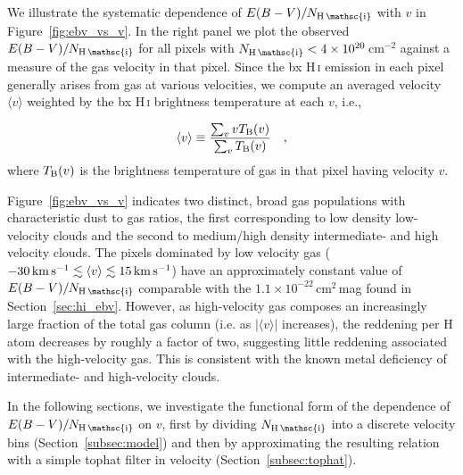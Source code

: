 \documentclass[iop,apj]{emulateapj}
\makeatletter
\def\testbx{bx}%
\DeclareRobustCommand{\ion}[2]{%
\relax\ifmmode
\ifx\testbx\f@series
{\mathbf{#1\,\mathsc{#2}}}\else
{\mathrm{#1\,\mathsc{#2}}}\fi
\else\textup{#1\,{\mdseries\textsc{#2}}}%
\fi}
\makeatother
\begin{document}
We illustrate the systematic dependence of $E(B-V)/N_\ion{H}{i}$ with $v$ in Figure~\ref{fig:ebv_vs_v}. In the right panel we plot the observed $E(B-V)/N_\ion{H}{i}$ for all pixels with $N_\ion{H}{i} < 4\times10^{20}$\,cm$^{-2}$ against a measure of the gas velocity in that pixel. Since the \ion{H}{i} emission in each pixel generally arises from gas at various velocities, we compute an averaged velocity $\langle v \rangle$ weighted by the \ion{H}{i} brightness temperature at each $v$, i.e.,

\begin{equation}
\label{eq:nh_v}
\langle v \rangle \equiv \frac{\sum_v v T_{\rm B}(v)}{\sum_v T_{\rm B}(v)}
~~~,
\end{equation}
where $T_{\rm B}(v)$ is the brightness temperature of gas in that pixel having velocity $v$.

Figure~\ref{fig:ebv_vs_v} indicates two distinct, broad gas populations with characteristic dust to gas ratios, the first corresponding to low density low-velocity clouds and the second to medium/high density intermediate- and high velocity clouds. The pixels dominated by low velocity gas ($-30\,{\rm km}\,{\rm s}^{-1} \lesssim \langle v \rangle \lesssim 15\,{\rm km}\,{\rm s}^{-1}$) have an approximately constant value of $E(B-V)/N_\ion{H}{i}$ comparable with the $1.1\times10^{-22}$\,cm$^2$\,mag found in Section~\ref{sec:hi_ebv}. However, as high-velocity gas composes an increasingly large fraction of the total gas column (i.e. as $|\langle v \rangle |$ increases), the reddening per H atom decreases by roughly a factor of two, suggesting little reddening associated with the high-velocity gas. This is consistent with the known metal deficiency of intermediate- and high-velocity clouds.

In the following sections, we investigate the functional form of the dependence of $E(B-V)/N_\ion{H}{i}$ on $v$, first by dividing $N_\ion{H}{i}$ into a discrete velocity bins (Section~\ref{subsec:model}) and then by approximating the resulting relation with a simple tophat filter in velocity (Section~\ref{subsec:tophat}).

\end{document}
